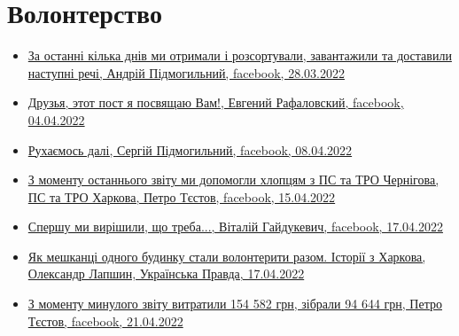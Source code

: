  
 
 
 
 

\section{Волонтерство}
\label{sec:topics.vojna.volonter}


\begin{itemize} %

\item \hyperlink{28_03_2022.fb.pidmogylnyj_andrij.kiev.terra_incognita.1.rechi}{%
За останні кілька днів ми отримали і розсортували, завантажили та доставили наступні речі, %
Андрій Підмогильний, facebook, 28.03.2022%
}

\item \hyperlink{04_04_2022.fb.rafalovskij_evgenij.kiev.1.druzja_post}{%
Друзья, этот пост я посвящаю Вам!, Евгений Рафаловский, facebook, %
04.04.2022%
}

\item \hyperlink{08_04_2022.fb.pidmogylnyj_sergij.1.ruhaemos_dali}{%
Рухаємось далі, Сергій Підмогильний, facebook, 08.04.2022%
}

\item \hyperlink{15_04_2022.fb.testov_petro.kiev.1.zvit_chernigov_harkov}{%
З моменту останнього звіту ми допомогли хлопцям з ПС та ТРО Чернігова, ПС та ТРО Харкова, %
Петро Тєстов, facebook, 15.04.2022%
}

\item \hyperlink{17_04_2022.fb.gajdukevich_vitalij.1.spershu_my_vyrishyly}{%
Спершу ми вирішили, що треба..., Віталій Гайдукевич, facebook, 17.04.2022%
}

\item \hyperlink{17_04_2022.stz.news.ua.pravda.2.budynok_volontery_istorii_harkov}{%
Як мешканці одного будинку стали волонтерити разом. Історії з Харкова, Олександр Лапшин, Українська Правда, %
17.04.2022%
}

\item \hyperlink{21_04_2022.fb.testov_petro.kiev.1.zvit}{%
З моменту минулого звіту витратили 154 582 грн, зібрали 94 644 грн, Петро Тєстов, facebook, 21.04.2022%
}


\end{itemize}

